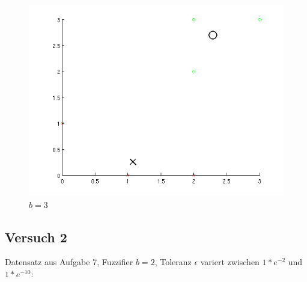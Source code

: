 \begin{figure}[h]
    \centering
    \includegraphics[width=0.5\linewidth]{../img/data7b3.png}
    \caption{$b = 3$}
\end{figure}

\FloatBarrier
\subsection*{Versuch 2}
Datensatz aus Aufgabe 7, Fuzzifier $b = 2$, Toleranz $\epsilon$ variert zwischen $1*e^{-2}$ und $1*e^{-10}$:
